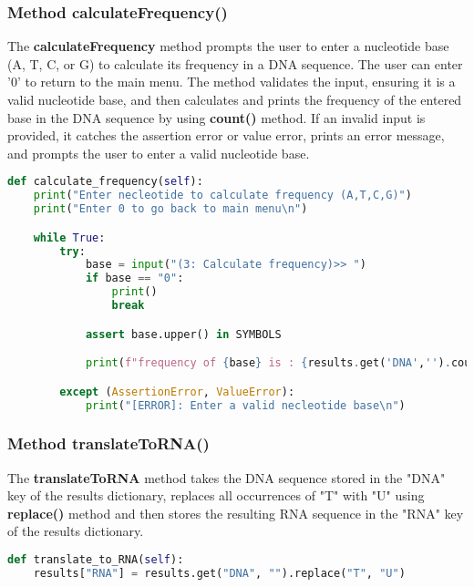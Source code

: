 \documentclass[11pt]{article}
\begin{document}
\subsubsection{Method calculateFrequency()}
The \textbf{calculateFrequency} method prompts the user to enter a nucleotide base (A, T, C, or G) to calculate its frequency in a DNA sequence. The user can enter '0' to return to the main menu. The method validates the input, ensuring it is a valid nucleotide base, and then calculates and prints the frequency of the entered base in the DNA sequence by using \textbf{count()} method. If an invalid input is provided, it catches the assertion error or value error, prints an error message, and prompts the user to enter a valid nucleotide base.
\begin{lstlisting}[language=Python, style=PythonStyle]
def calculate_frequency(self):
    print("Enter necleotide to calculate frequency (A,T,C,G)")
    print("Enter 0 to go back to main menu\n")

    while True:
        try:
            base = input("(3: Calculate frequency)>> ")
            if base == "0":
                print()
                break

            assert base.upper() in SYMBOLS

            print(f"frequency of {base} is : {results.get('DNA','').count(base)}\n")

        except (AssertionError, ValueError):
            print("[ERROR]: Enter a valid necleotide base\n")
\end{lstlisting}

\subsubsection{Method translateToRNA()}
The \textbf{translateToRNA} method takes the DNA sequence stored in the "DNA" key of the results dictionary, replaces all occurrences of "T" with "U" using \textbf{replace()} method and then stores the resulting RNA sequence in the "RNA" key of the results dictionary.
\begin{lstlisting}[language=Python, style=PythonStyle]
def translate_to_RNA(self):
    results["RNA"] = results.get("DNA", "").replace("T", "U")
\end{lstlisting}
\end{document}
